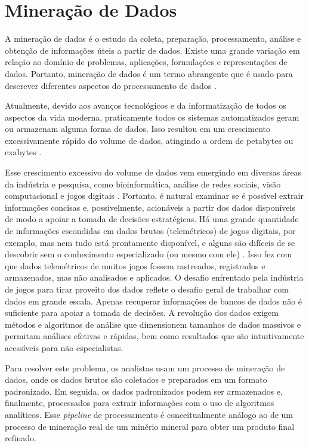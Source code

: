 \section{Mineração de Dados}
A mineração de dados é o estudo da coleta, preparação, processamento, análise e obtenção de informações úteis a partir de dados. Existe uma grande variação em relação ao domínio de problemas, aplicações, formulações e representações de dados. Portanto, mineração de dados é um termo abrangente que é usado para descrever diferentes aspectos do processamento de dados \cite{aggarwal2015data}.

Atualmente, devido aos avanços tecnológicos e da informatização de todos os aspectos da vida moderna, praticamente todos os sistemas automatizados geram ou armazenam alguma forma de dados. Isso resultou em um crescimento excessivamente rápido do volume de dados, atingindo a ordem de petabytes ou exabytes \cite{aggarwal2015data}.

Esse crescimento excessivo do volume de dados vem emergindo em diversas áreas da indústria e pesquisa, como bioinformática, análise de redes sociais, visão computacional e jogos digitais \cite{el2016game}. Portanto, é natural examinar se é possível extrair informações concisas e, possivelmente, acionáveis a partir dos dados disponíveis de modo a apoiar a tomada de decisões estratégicas. Há uma grande quantidade de informações escondidas em dados brutos (telemétricos) de jogos digitais, por exemplo, mas nem tudo está prontamente disponível, e alguns são difíceis de se descobrir sem o conhecimento especializado (ou mesmo com ele) \cite{el2016game}. Isso fez com que dados telemétricos de muitos jogos fossem rastreados, registrados e armazenados, mas não analisados e aplicados. O desafio enfrentado pela indústria de jogos para tirar proveito dos dados reflete o desafio geral de trabalhar com dados em grande escala. Apenas recuperar informações de bancos de dados não é suficiente para apoiar a tomada de decisões. A revolução dos dados exigem métodos e algoritmos de análise que dimensionem tamanhos de dados massivos e permitam análises efetivas e rápidas, bem como resultados que são intuitivamente acessíveis para não especialistas.

Para resolver este problema, os analistas usam um processo de mineração de dados, onde os dados brutos são coletados e preparados em um formato padronizado. Em seguida, os dados padronizados podem ser armazenados e, finalmente, processados para extrair informações com o uso de algoritmos analíticos. Esse \textit{pipeline} de processamento é conceitualmente análogo ao de um processo de mineração real de um minério mineral para obter um produto final refinado.

